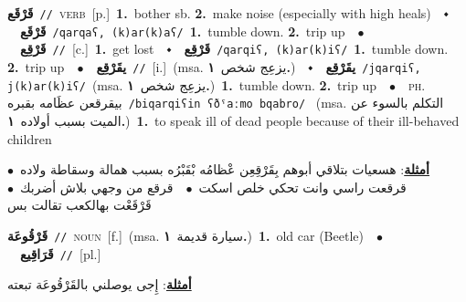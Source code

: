 \documentclass[10pt,a4paper,twoside]{article} %
\begin{document}
\begin{multicols}{2}
{\setlength\topsep{0pt}\textbf{\foreignlanguage{arabic}{قَرْقَع}}\ {\color{gray}\texttt{//}\color{black}}\ \textsc{verb}\ [p.]\ \textbf{1.}~bother sb.  \textbf{2.}~make noise (especially with high heals)\ \ $\smblkdiamond$\ \ \setlength\topsep{0pt}\textbf{\foreignlanguage{arabic}{قَرْقَع}}\ {\color{gray}\texttt{/qarqaʕ, (k)ar(k)aʕ/}\color{black}}\ \textbf{1.}~tumble down.  \textbf{2.}~trip up\ \ $\bullet$\ \ \setlength\topsep{0pt}\textbf{\foreignlanguage{arabic}{قَرْقِع}}\ {\color{gray}\texttt{//}\color{black}}\ [c.]\ \textbf{1.}~get lost\ \ $\smblkdiamond$\ \ \setlength\topsep{0pt}\textbf{\foreignlanguage{arabic}{قَرْقِع}}\ {\color{gray}\texttt{/qarqiʕ, (k)ar(k)iʕ/}\color{black}}\ \textbf{1.}~tumble down.  \textbf{2.}~trip up\ \ $\bullet$\ \ \setlength\topsep{0pt}\textbf{\foreignlanguage{arabic}{يقَرْقِع}}\ {\color{gray}\texttt{//}\color{black}}\ [i.]\ \color{gray}(msa. \foreignlanguage{arabic}{يزعِج شخص}~\foreignlanguage{arabic}{\textbf{١.}})\color{black}\ \ $\smblkdiamond$\ \ \setlength\topsep{0pt}\textbf{\foreignlanguage{arabic}{يقَرْقِع}}\ {\color{gray}\texttt{/jqarqiʕ, j(k)ar(k)iʕ/}\color{black}}\ \color{gray}(msa. \foreignlanguage{arabic}{يزعِج شخص}~\foreignlanguage{arabic}{\textbf{١.}})\color{black}\ \textbf{1.}~tumble down.  \textbf{2.}~trip up\ \ $\bullet$\ \ \textsc{ph.} \color{gray} \foreignlanguage{arabic}{بيقرقعن عظَامه بقبره}\color{black}\ {\color{gray}\texttt{/{\sffamily biqarqiʕin ʕðˤaːmo bqabro}/}\color{black}}\ \color{gray} (msa. \foreignlanguage{arabic}{التكلم بالسوء عن الميت بسبب أولاده}~\foreignlanguage{arabic}{\textbf{١.}})\color{black}\ \textbf{1.}~to speak ill of dead people because of their ill-behaved children\  \begin{flushright}\color{gray}\foreignlanguage{arabic}{\textbf{\underline{\foreignlanguage{arabic}{أمثلة}}}: هسعيات بتلاقي أبوهم بِقَرْقِعِن عْظامُه بْقَبْرُه بسبب همالة وسقاطة ولاده\ $\bullet$\ \  قرقعت راسي وانت تحكي خلص اسكت\ $\bullet$\ \  قرقع من وجهي بلاش أضربك\ $\bullet$\ \  قَرْقَعْت بهالكعب تقالت بس}\end{flushright}\color{black}} \vspace{2mm}

{\setlength\topsep{0pt}\textbf{\foreignlanguage{arabic}{قَرْقُوعَة}}\ {\color{gray}\texttt{//}\color{black}}\ \textsc{noun}\ [f.]\ \color{gray}(msa. \foreignlanguage{arabic}{سيارة قديمة}~\foreignlanguage{arabic}{\textbf{١.}})\color{black}\ \textbf{1.}~old car (Beetle)\ \ $\bullet$\ \ \setlength\topsep{0pt}\textbf{\foreignlanguage{arabic}{قَرَاقِيع}}\ {\color{gray}\texttt{//}\color{black}}\ [pl.]\  \begin{flushright}\color{gray}\foreignlanguage{arabic}{\textbf{\underline{\foreignlanguage{arabic}{أمثلة}}}: إِجى يوصلني بالقَرْقُوعَة تبعته}\end{flushright}\color{black}} \vspace{2mm}


\end{multicols}
\end{document}
